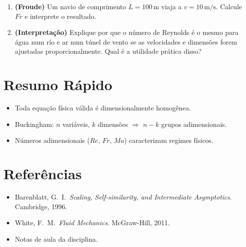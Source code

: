 \documentclass[12pt,a4paper]{article}
\begin{document}
\begin{enumerate}
  \item \textbf{(Froude)} Um navio de comprimento $L=100\,\text{m}$ viaja a $v=10\,\text{m/s}$. Calcule $Fr$ e interprete o resultado.
  
  \item \textbf{(Interpreta\c{c}\~ao)} Explique por que o n\'umero de Reynolds \'e o mesmo para \'agua num r\'io e ar num t\'unel de vento se as velocidades e dimens\~oes forem ajustadas proporcionalmente. Qual \'e a utilidade pr\'atica disso?
\end{enumerate}

\section*{Resumo R\'apido}
\begin{itemize}
  \item Toda equa\c{c}\~ao f\'isica v\'alida \'e dimensionalmente homog\^enea.
  \item Buckingham: $n$ vari\'aveis, $k$ dimens\~oes $\Rightarrow$ $n-k$ grupos adimensionais.
  \item N\'umeros adimensionais ($Re$, $Fr$, $Ma$) caracterizam regimes f\'isicos.
\end{itemize}

\section*{Refer\^encias}
\begin{itemize}
  \item Barenblatt, G.\ I.\ \textit{Scaling, Self-similarity, and Intermediate Asymptotics}. Cambridge, 1996.
  \item White, F.\ M.\ \textit{Fluid Mechanics}. McGraw-Hill, 2011.
  \item Notas de aula da disciplina.
\end{itemize}
\end{document}

